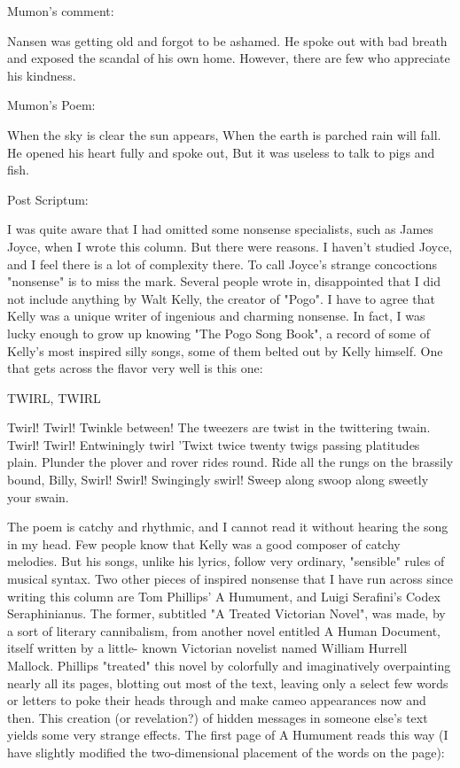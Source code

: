 Mumon's comment:

Nansen was getting old and forgot to be ashamed. He spoke out with bad breath and
exposed the scandal of his own home. However, there are few who appreciate his
kindness.

                      Mumon's Poem:

              When the sky is clear the sun appears,
              When the earth is parched rain will fall.
              He opened his heart fully and spoke out,
              But it was useless to talk to pigs and fish.





Post Scriptum:

        I was quite aware that I had omitted some nonsense specialists, such as James
Joyce, when I wrote this column. But there were reasons. I haven't studied Joyce, and I
feel there is a lot of complexity there. To call Joyce's strange concoctions "nonsense" is to
miss the mark.
        Several people wrote in, disappointed that I did not include anything by Walt
Kelly, the creator of "Pogo". I have to agree that Kelly was a unique writer of ingenious
and charming nonsense. In fact, I was lucky enough to grow up knowing "The Pogo Song
Book", a record of some of Kelly's most inspired silly songs, some of them belted out by
Kelly himself. One that gets across the flavor very well is this one:

                        TWIRL, TWIRL

                 Twirl! Twirl! Twinkle between!
                 The tweezers are twist in the twittering twain.
                 Twirl! Twirl! Entwiningly twirl
                 'Twixt twice twenty twigs passing platitudes plain.
                 Plunder the plover and rover rides round.
                 Ride all the rungs on the brassily bound,
                 Billy, Swirl! Swirl! Swingingly swirl!
                 Sweep along swoop along sweetly your swain.

The poem is catchy and rhythmic, and I cannot read it without hearing the song in my
head. Few people know that Kelly was a good composer of catchy melodies. But his
songs, unlike his lyrics, follow very ordinary, "sensible" rules of musical syntax.
        Two other pieces of inspired nonsense that I have run across since writing this
column are Tom Phillips' A Humument, and Luigi Serafini's Codex Seraphinianus. The
former, subtitled "A Treated Victorian Novel", was made, by a sort of literary
cannibalism, from another novel entitled A Human Document, itself written by a little-
known Victorian novelist named William Hurrell Mallock. Phillips "treated" this novel
by colorfully and imaginatively overpainting nearly all its pages, blotting out most of the
text, leaving only a select few words or letters to poke their heads through and make
cameo appearances now and then. This creation (or revelation?) of hidden messages in
someone else's text yields some very strange effects. The first page of A Humument reads
this way (I have slightly modified the two-dimensional placement of the words on the
page):

